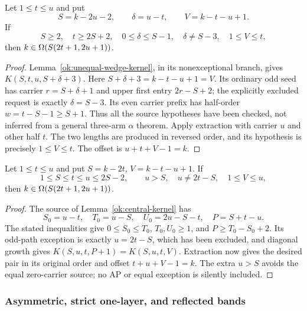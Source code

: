 \begin{proposition}\label{ok:short-pair-band}
Let $1\le t\le u$ and put
\[
 S=k-2u-2,\qquad\delta=u-t,\qquad V=k-t-u+1.
 \]
If
\[
 S\ge2,\quad t\ge2S+2,\quad
 0\le\delta\le S-1,\quad\delta\ne S-3,\quad1\le V\le t,
 \]
then $k\in\Omega(S\!\left(2t+1,2u+1\right))$.
\end{proposition}
\begin{proof}
Lemma~\ref{ok:unequal-wedge-kernel}, in its nonexceptional branch,
gives $K(S,t,u,S+\delta+3)$.
Here $S+\delta+3=k-t-u+1=V$.
Its ordinary odd seed has carrier $r=S+\delta+1$ and upper
first entry $2r-S+2$; the explicitly excluded request is
exactly $\delta=S-3$.
Its even carrier prefix has half-order $w=t-S-1\ge S+1$.
Thus all the source hypotheses have been checked, not inferred
from a general three-arm $\alpha$ theorem.
Apply extraction with carrier $u$ and other half $t$.
The two lengths are produced in reversed order, and its hypothesis
is precisely $1\le V\le t$. The offset is $u+t+V-1=k$.
\end{proof}

\begin{proposition}\label{ok:central-pair-band}
Let $1\le t\le u$ and put $S=k-2t$, $V=k-t-u+1$.
If
\[
 1\le S\le t\le u\le2S-2,\qquad
 u>S,\quad u\ne2t-S,\quad1\le V\le u,
 \]
then $k\in\Omega(S\!\left(2t+1,2u+1\right))$.
\end{proposition}
\begin{proof}
The source of Lemma~\ref{ok:central-kernel} has
\[
 S_0=u-t,\quad T_0=u-S,\quad
 U_0=2u-S-t,\quad P=S+t-u.
 \]
The stated inequalities give $0\le S_0\le T_0$,
$T_0,U_0\ge1$, and $P\ge T_0-S_0+2$.
Its odd-path exception is exactly $u=2t-S$, which has been
excluded, and diagonal growth gives
$K(S,u,t,P+1)=K(S,u,t,V)$.
Extraction now gives the desired pair in its original order and
offset $t+u+V-1=k$. The extra $u>S$ avoids the equal zero-carrier
source; no AP or equal exception is silently included.
\end{proof}

\subsubsection{Asymmetric, strict one-layer, and reflected bands}

